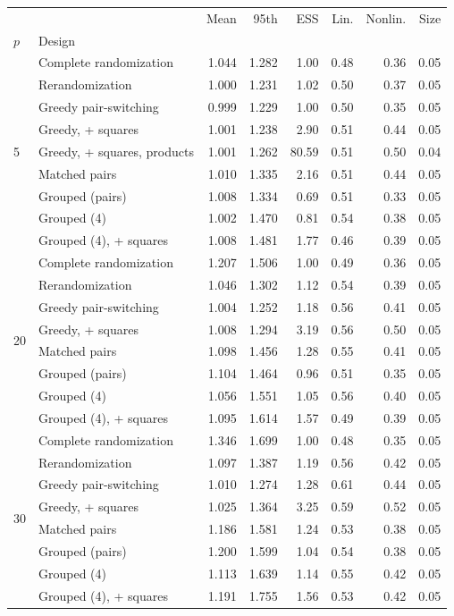 \begin{tabular}{llrrrrrr}
\toprule
 &  & Mean & 95th & ESS & Lin. & Nonlin. & Size \\
$p$ & Design &  &  &  &  &  &  \\
\midrule
\multirow[t]{9}{*}{5} & Complete randomization & 1.044 & 1.282 & 1.00 & 0.48 & 0.36 & 0.05 \\
 & Rerandomization & 1.000 & 1.231 & 1.02 & 0.50 & 0.37 & 0.05 \\
 & Greedy pair-switching & 0.999 & 1.229 & 1.00 & 0.50 & 0.35 & 0.05 \\
 & Greedy, + squares & 1.001 & 1.238 & 2.90 & 0.51 & 0.44 & 0.05 \\
 & Greedy, + squares, products & 1.001 & 1.262 & 80.59 & 0.51 & 0.50 & 0.04 \\
 & Matched pairs & 1.010 & 1.335 & 2.16 & 0.51 & 0.44 & 0.05 \\
 & Grouped (pairs) & 1.008 & 1.334 & 0.69 & 0.51 & 0.33 & 0.05 \\
 & Grouped (4) & 1.002 & 1.470 & 0.81 & 0.54 & 0.38 & 0.05 \\
 & Grouped (4), + squares & 1.008 & 1.481 & 1.77 & 0.46 & 0.39 & 0.05 \\
\multirow[t]{8}{*}{20} & Complete randomization & 1.207 & 1.506 & 1.00 & 0.49 & 0.36 & 0.05 \\
 & Rerandomization & 1.046 & 1.302 & 1.12 & 0.54 & 0.39 & 0.05 \\
 & Greedy pair-switching & 1.004 & 1.252 & 1.18 & 0.56 & 0.41 & 0.05 \\
 & Greedy, + squares & 1.008 & 1.294 & 3.19 & 0.56 & 0.50 & 0.05 \\
 & Matched pairs & 1.098 & 1.456 & 1.28 & 0.55 & 0.41 & 0.05 \\
 & Grouped (pairs) & 1.104 & 1.464 & 0.96 & 0.51 & 0.35 & 0.05 \\
 & Grouped (4) & 1.056 & 1.551 & 1.05 & 0.56 & 0.40 & 0.05 \\
 & Grouped (4), + squares & 1.095 & 1.614 & 1.57 & 0.49 & 0.39 & 0.05 \\
\multirow[t]{8}{*}{30} & Complete randomization & 1.346 & 1.699 & 1.00 & 0.48 & 0.35 & 0.05 \\
 & Rerandomization & 1.097 & 1.387 & 1.19 & 0.56 & 0.42 & 0.05 \\
 & Greedy pair-switching & 1.010 & 1.274 & 1.28 & 0.61 & 0.44 & 0.05 \\
 & Greedy, + squares & 1.025 & 1.364 & 3.25 & 0.59 & 0.52 & 0.05 \\
 & Matched pairs & 1.186 & 1.581 & 1.24 & 0.53 & 0.38 & 0.05 \\
 & Grouped (pairs) & 1.200 & 1.599 & 1.04 & 0.54 & 0.38 & 0.05 \\
 & Grouped (4) & 1.113 & 1.639 & 1.14 & 0.55 & 0.42 & 0.05 \\
 & Grouped (4), + squares & 1.191 & 1.755 & 1.56 & 0.53 & 0.42 & 0.05 \\
\bottomrule
\end{tabular}
